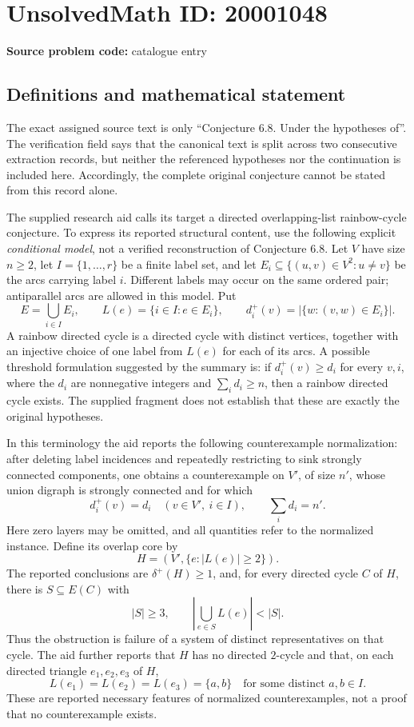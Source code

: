 \documentclass[11pt]{article}
\begin{document}
\section*{UnsolvedMath ID: 20001048}
\textbf{Source problem code:} catalogue entry
\subsection{Definitions and mathematical statement}
The exact assigned source text is only ``Conjecture 6.8. Under the hypotheses of''. The verification field says that the canonical text is split across two consecutive extraction records, but neither the referenced hypotheses nor the continuation is included here. Accordingly, the complete original conjecture cannot be stated from this record alone.

The supplied research aid calls its target a directed overlapping-list rainbow-cycle conjecture. To express its reported structural content, use the following explicit \emph{conditional model}, not a verified reconstruction of Conjecture 6.8. Let \(V\) have size \(n\geq2\), let \(I=\{1,\ldots,r\}\) be a finite label set, and let \(E_i\subseteq\{(u,v)\in V^2:u\ne v\}\) be the arcs carrying label \(i\). Different labels may occur on the same ordered pair; antiparallel arcs are allowed in this model. Put
\[
 E=\bigcup_{i\in I}E_i,\qquad L(e)=\{i\in I:e\in E_i\},\qquad
 d_i^+(v)=|\{w:(v,w)\in E_i\}|.
\]
A rainbow directed cycle is a directed cycle with distinct vertices, together with an injective choice of one label from \(L(e)\) for each of its arcs. A possible threshold formulation suggested by the summary is: if \(d_i^+(v)\geq d_i\) for every \(v,i\), where the \(d_i\) are nonnegative integers and \(\sum_i d_i\geq n\), then a rainbow directed cycle exists. The supplied fragment does not establish that these are exactly the original hypotheses.

In this terminology the aid reports the following counterexample normalization: after deleting label incidences and repeatedly restricting to sink strongly connected components, one obtains a counterexample on \(V'\), of size \(n'\), whose union digraph is strongly connected and for which
\[
 d_i^+(v)=d_i\quad(v\in V',\ i\in I),\qquad \sum_i d_i=n'.
\]
Here zero layers may be omitted, and all quantities refer to the normalized instance. Define its overlap core by
\[
 H=(V',\{e:|L(e)|\geq2\}).
\]
The reported conclusions are \(\delta^+(H)\geq1\), and, for every directed cycle \(C\) of \(H\), there is \(S\subseteq E(C)\) with
\[
 |S|\geq3,\qquad \left|\bigcup_{e\in S}L(e)\right|<|S|.
\]
Thus the obstruction is failure of a system of distinct representatives on that cycle. The aid further reports that \(H\) has no directed \(2\)-cycle and that, on each directed triangle \(e_1,e_2,e_3\) of \(H\),
\[
 L(e_1)=L(e_2)=L(e_3)=\{a,b\}\quad\text{for some distinct }a,b\in I.
\]
These are reported necessary features of normalized counterexamples, not a proof that no counterexample exists.
\end{document}

